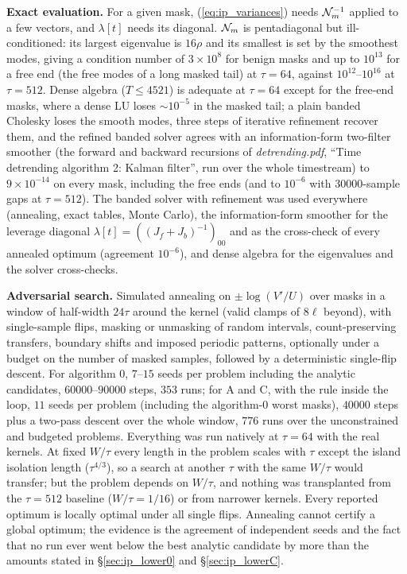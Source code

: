 \documentclass{article}
\numberwithin{equation}{section}   %
\newcommand{\dtnotes}[1]{{\em detrending.pdf}, ``#1''}
\begin{document}
{\bf Exact evaluation.}  For a given mask, (\ref{eq:ip_variances}) needs ${\cal N}_m^{-1}$ applied to a
few vectors, and $\lambda[t]$ needs its diagonal.  ${\cal N}_m$ is pentadiagonal but ill-conditioned:
its largest eigenvalue is $16\rho$ and its smallest is set by the smoothest modes, giving a condition
number of $3 \times 10^8$ for benign masks and up to $10^{13}$ for a free end (the free modes of a long
masked tail) at $\tau = 64$, against $10^{12}$--$10^{16}$ at $\tau = 512$.  Dense algebra
($T \le 4521$) is adequate at $\tau = 64$ except for the free-end masks, where a dense LU loses
$\sim 10^{-5}$ in the masked tail; a plain banded Cholesky loses the smooth modes, three steps of
iterative refinement recover them, and the refined banded solver agrees with an information-form
two-filter smoother (the forward and backward recursions of \dtnotes{Time detrending algorithm 2: Kalman
filter}, run over the whole timestream) to $9 \times 10^{-14}$ on every mask, including the free ends
(and to $10^{-6}$ with $30000$-sample gaps at $\tau = 512$).  The banded solver with refinement was used
everywhere (annealing, exact tables, Monte Carlo), the information-form smoother for the leverage
diagonal $\lambda[t] = ((J_f + J_b)^{-1})_{00}$ and as the cross-check of every annealed optimum
(agreement $10^{-6}$), and dense algebra for the eigenvalues and the solver cross-checks.

{\bf Adversarial search.}  Simulated annealing on $\pm\log(V'/U)$ over masks in a window of half-width
$24\tau$ around the kernel (valid clamps of $8\ell$ beyond), with single-sample flips, masking or
unmasking of random intervals, count-preserving transfers, boundary shifts and imposed periodic patterns,
optionally under a budget on the number of masked samples, followed by a deterministic single-flip
descent.  For algorithm 0, $7$--$15$ seeds per problem including the analytic candidates,
$60000$--$90000$ steps, $353$ runs; for A and C, with the rule inside the loop, $11$ seeds per problem
(including the algorithm-0 worst masks), $40000$ steps plus a two-pass descent over the whole window,
$776$ runs over the unconstrained and budgeted problems.  Everything was run natively at $\tau = 64$ with
the real kernels.  At fixed $W/\tau$ every length in the problem scales with $\tau$ except the island
isolation length ($\tau^{4/3}$), so a search at another $\tau$ with the same $W/\tau$ would transfer;
but the problem depends on $W/\tau$, and nothing was transplanted from the $\tau = 512$ baseline
($W/\tau = 1/16$) or from narrower kernels.  Every reported optimum is locally optimal under all single
flips.  Annealing cannot certify a global optimum; the evidence is the agreement of independent seeds
and the fact that no run ever went below the best analytic candidate by more than the amounts stated in
\S\ref{sec:ip_lower0} and \S\ref{sec:ip_lowerC}.
\end{document}
